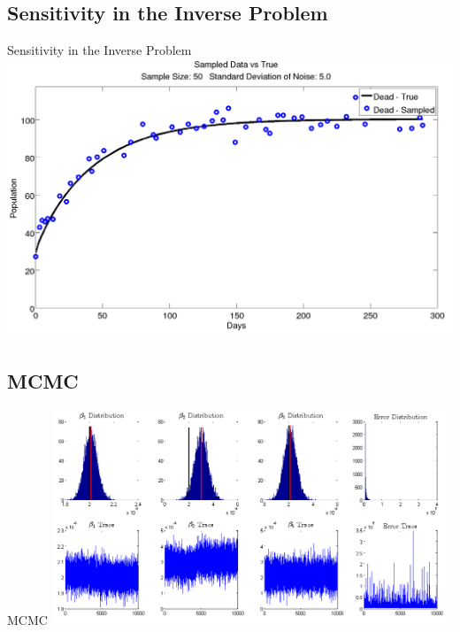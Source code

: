 \documentclass{beamer}
\begin{document}
\subsection{Sensitivity in the Inverse Problem}

\begin{frame}{Sensitivity in the Inverse Problem}
\centering
\includegraphics[scale=0.2]{noise}
\end{frame}

\subsection{MCMC}

\begin{frame}{MCMC}
\centering 
\includegraphics[width = 11.8cm]{mcmcoutput}
\end{frame}
\end{document}
